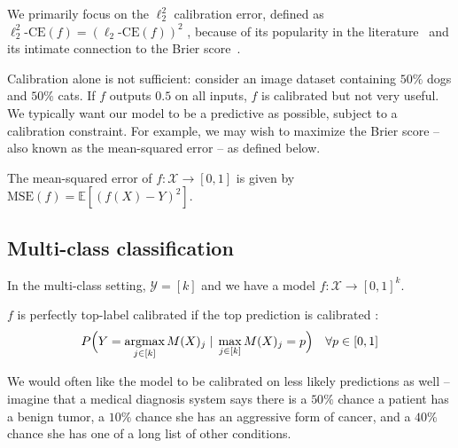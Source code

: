 We primarily focus on the $\ell_2^2$ calibration error, defined as $\ell_2^2\mbox{-CE}(f) = (\ell_2\mbox{-CE}(f))^2$ , because of its popularity in the literature~\cite{nguyen2015posterior, hendrycks2019anomaly, kuleshov2015calibrated, hendrycks2019pretraining} and its intimate  connection to the Brier score~\cite{murphy1973vector,degroot1983forecasters}.

Calibration alone is not sufficient: consider an image dataset containing $50\%$ dogs and $50\%$ cats.
If $f$ outputs $0.5$ on all inputs, $f$ is calibrated but not very useful.
We typically want our model to be a predictive as possible, subject to a calibration constraint.
For example, we may wish to maximize the Brier score -- also known as the mean-squared error -- as defined below.

\begin{definition}
The mean-squared error of $f : \mathcal{X} \to [0, 1]$ is given by $\mbox{MSE}(f) = \mathbb{E}[(f(X) - Y)^2]$.
\end{definition}

\subsection{Multi-class classification}

In the multi-class setting, $\mathcal{Y} = [k]$ 
and we have a model $f : \mathcal{X} \to [0, 1]^k$.

\begin{definition}
$f$ is perfectly top-label calibrated if the top prediction is calibrated :
\[ P\Big(Y = \mathop{\mbox{argmax}}_{j \in [k]} M(X)_j \; | \; \max_{j \in [k]} M(X)_j = p\Big) \quad \forall p \in [0, 1] \]
\end{definition}

We would often like the model to be calibrated on less likely predictions as well -- imagine that a medical diagnosis system says there is a $50\%$ chance a patient has a benign tumor, a $10\%$ chance she has an aggressive form of cancer, and a $40\%$ chance she has one of a long list of other conditions.

